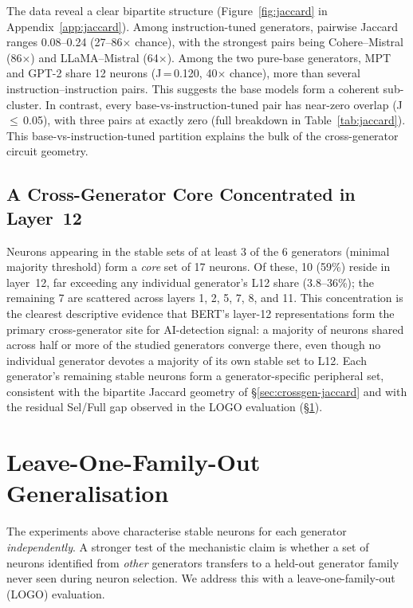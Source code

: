 \documentclass[11pt]{article}
\begin{document}
The data reveal a clear bipartite structure (Figure~\ref{fig:jaccard} in Appendix~\ref{app:jaccard}). Among instruction-tuned generators, pairwise Jaccard ranges 0.08--0.24 (27--86$\times$ chance), with the strongest pairs being Cohere--Mistral (86$\times$) and LLaMA--Mistral (64$\times$). Among the two pure-base generators, MPT and GPT-2 share 12 neurons (J\,=\,0.120, 40$\times$ chance), more than several instruction--instruction pairs. This suggests the base models form a coherent sub-cluster. In contrast, every base-vs-instruction-tuned pair has near-zero overlap (J\,$\leq$\,0.05), with three pairs at exactly zero (full breakdown in Table~\ref{tab:jaccard}). This base-vs-instruction-tuned partition explains the bulk of the cross-generator circuit geometry.

\subsection{A Cross-Generator Core Concentrated in Layer~12}
\label{sec:crossgen-core}

Neurons appearing in the stable sets of at least 3 of the 6 generators (minimal majority threshold) form a \textit{core} set of 17 neurons. Of these, 10 (59\%) reside in layer~12, far exceeding any individual generator's L12 share (3.8--36\%); the remaining 7 are scattered across layers 1, 2, 5, 7, 8, and 11. This concentration is the clearest descriptive evidence that BERT's layer-12 representations form the primary cross-generator site for AI-detection signal: a majority of neurons shared across half or more of the studied generators converge there, even though no individual generator devotes a majority of its own stable set to L12. Each generator's remaining stable neurons form a generator-specific peripheral set, consistent with the bipartite Jaccard geometry of §\ref{sec:crossgen-jaccard} and with the residual Sel/Full gap observed in the LOGO evaluation (§\ref{sec:logo}).

\section{Leave-One-Family-Out Generalisation}
\label{sec:logo}

The experiments above characterise stable neurons for each generator
\emph{independently}.  A stronger test of the mechanistic claim is whether a
set of neurons identified from \textit{other} generators transfers to a
held-out generator family never seen during neuron selection.  We address this
with a leave-one-family-out (LOGO) evaluation.
\end{document}
